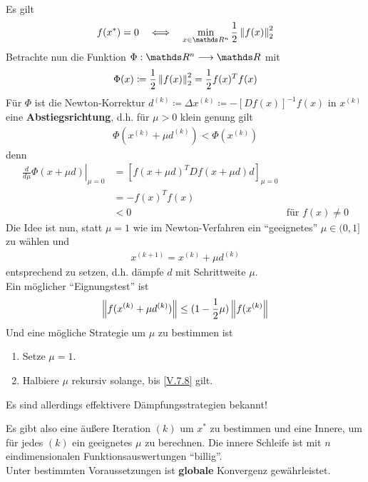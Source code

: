 Es gilt
\begin{gather}
  f(x^{*}) = 0 \quad \Longleftrightarrow \quad 
  \min_{x\in\Ren} \frac{1}{2} \nn[f(x)]_2^2
  \label{V.7.5}
\end{gather}
Betrachte nun die Funktion $\Phi: \Ren\longrightarrow \R$ mit 
\begin{gather*}
  \Phi (x) \coloneqq \frac{1}{2} \nn[f(x)]_2^2 
  = \frac{1}{2} f(x)^T f(x)
\end{gather*}
Für $\Phi$ ist die Newton-Korrektur
$d^{(k)} \coloneqq \Delta x^{(k)} \coloneqq -[Df(x)]^{-1}f(x)$
in $x^{(k)} $ eine \textbf{Abstiegsrichtung},
d.h. für $\mu >0 $ klein genung gilt
\begin{gather}
  \Phi(x^{(k)}+\mu d^{(k)}) < \Phi(x^{(k)} )
  \label{V.7.6}
\end{gather}
denn 
\begin{align*}
  \left.\frac{d}{d\mu} \Phi(x+\mu d)\right\vert_{\mu = 0} 
  &= \left[f(x+\mu d)^TDf(x+\mu d)d\right]_{\mu = 0}\\
  &= -f(x)^Tf(x) \\
  &< 0 & \text{für } f(x)\neq 0
\end{align*}
Die Idee ist nun, statt $\mu = 1$ wie im Newton-Verfahren
ein \enquote{geeignetes} $\mu \in (0,1]$ zu wählen und 
\begin{gather}
  x^{(k+1)} = x^{(k)} +\mu d^{(k)}
  \label{V.7.7}
\end{gather}
entsprechend zu setzen, d.h. dämpfe $d$ mit Schrittweite $\mu$.\\
Ein möglicher \enquote{Eignungstest} ist
\begin{gather}
  \nn[f(x^{(k)}+\mu d^{(k)})]
  \leq (1-\frac{1}{2}\mu )\nn[f(x^{(k)}]
  \label{V.7.8}
\end{gather}
Und eine mögliche Strategie um $\mu $ zu bestimmen ist 
\begin{enumerate}[1.]
\item Setze $\mu=1$.
\item Halbiere $\mu$ rekursiv solange, bis \eqref{V.7.8} gilt.
\end{enumerate}
Es sind allerdings effektivere Dämpfungsstrategien bekannt!

Es gibt also eine äußere Iteration $(k)$
um $x^{*}$ zu bestimmen
und eine Innere, um für jedes $(k)$
ein geeignetes $\mu$ zu berechnen.
Die innere Schleife ist mit $n$ eindimensionalen Funktionsauswertungen
\enquote{billig}. \\
Unter bestimmten Voraussetzungen ist
\textbf{globale} Konvergenz gewährleistet.

